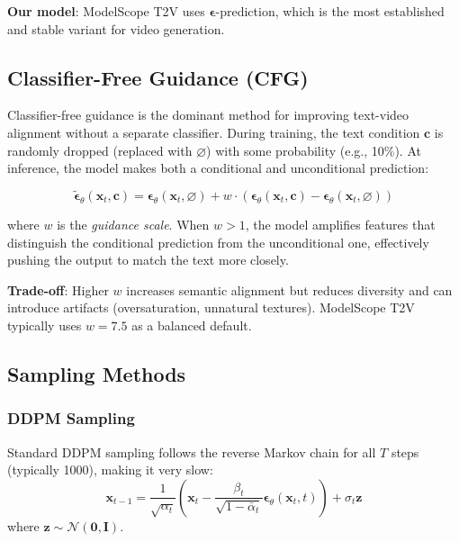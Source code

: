 \documentclass[conference]{IEEEtran}
\begin{document}
\textbf{Our model}: ModelScope T2V uses $\boldsymbol{\epsilon}$-prediction, which is the most established and stable variant for video generation.

\subsection{Classifier-Free Guidance (CFG)}

Classifier-free guidance \cite{ho2022classifier} is the dominant method for improving text-video alignment without a separate classifier. During training, the text condition $\mathbf{c}$ is randomly dropped (replaced with $\varnothing$) with some probability (e.g., 10\%). At inference, the model makes both a conditional and unconditional prediction:

\begin{equation}
    \tilde{\boldsymbol{\epsilon}}_\theta(\mathbf{x}_t, \mathbf{c}) = \boldsymbol{\epsilon}_\theta(\mathbf{x}_t, \varnothing) + w \cdot \left(\boldsymbol{\epsilon}_\theta(\mathbf{x}_t, \mathbf{c}) - \boldsymbol{\epsilon}_\theta(\mathbf{x}_t, \varnothing)\right)
    \label{eq:cfg}
\end{equation}

where $w$ is the \textit{guidance scale}. When $w > 1$, the model amplifies features that distinguish the conditional prediction from the unconditional one, effectively pushing the output to match the text more closely.

\textbf{Trade-off}: Higher $w$ increases semantic alignment but reduces diversity and can introduce artifacts (oversaturation, unnatural textures). ModelScope T2V typically uses $w = 7.5$ as a balanced default.

\subsection{Sampling Methods}

\subsubsection{DDPM Sampling}
Standard DDPM sampling follows the reverse Markov chain for all $T$ steps (typically 1000), making it very slow:
\begin{equation}
    \mathbf{x}_{t-1} = \frac{1}{\sqrt{\alpha_t}}\left(\mathbf{x}_t - \frac{\beta_t}{\sqrt{1 - \bar{\alpha}_t}}\boldsymbol{\epsilon}_\theta(\mathbf{x}_t, t)\right) + \sigma_t \mathbf{z}
\end{equation}
where $\mathbf{z} \sim \mathcal{N}(\mathbf{0}, \mathbf{I})$.
\end{document}

